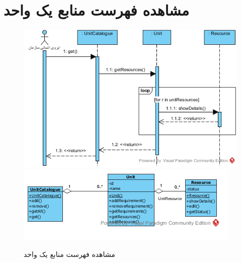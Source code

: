 \section{مشاهده فهرست منابع یک واحد}
\begin{figure}[H]
	\centering
	\includegraphics[scale=0.8]{img/sequence-analysis/ViewListOfResources}
	\includegraphics[scale=0.8]{img/sequence-analysis/ViewListOfResourcesC}
	\caption{مشاهده فهرست منابع یک واحد}
\end{figure}

